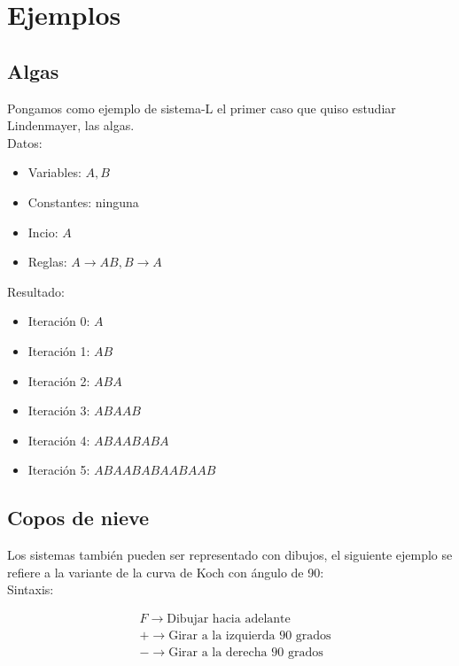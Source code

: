 \section{Ejemplos}

\subsection{Algas}

\noindent Pongamos como ejemplo de sistema-L el primer caso que quiso estudiar Lindenmayer, las algas. \cite{eswiki:l-systems}\\

\noindent Datos:

\begin{itemize}
    \item Variables: $A,B$
    \item Constantes: ninguna
    \item Incio: $A$
    \item Reglas: $A \rightarrow AB, B \rightarrow A$
\end{itemize}

\noindent Resultado:

\begin{itemize}
    \item Iteración 0: $A$
    \item Iteración 1: $AB$
    \item Iteración 2: $ABA$
    \item Iteración 3: $ABAAB$
    \item Iteración 4: $ABAABABA$
    \item Iteración 5: $ABAABABAABAAB$
\end{itemize}

\subsection{Copos de nieve}

\noindent Los sistemas también pueden ser representado con dibujos, el siguiente ejemplo se refiere a la variante de la curva de Koch con ángulo de 90: \cite{eswiki:l-systems}\\

\noindent Sintaxis:

\begin{equation}
    \begin{split}
        & F\rightarrow \text{Dibujar hacia adelante}\\
        & +\rightarrow \text{Girar a la izquierda } 90 \text{ grados}\\
        & -\rightarrow \text{Girar a la derecha } 90 \text{ grados}\\
    \end{split}
\end{equation}

